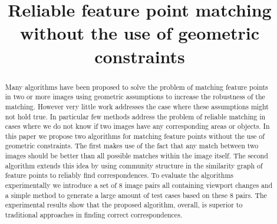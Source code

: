 \documentclass[conference]{IEEEtran}
\begin{document}
\title{Reliable feature point matching without the use of geometric 
constraints}

\maketitle
%
\begin{abstract}
Many algorithms have been proposed to solve the problem of matching 
feature points in two or more images using geometric assumptions to 
increase the robustness of the matching. However very little work 
addresses the case where these assumptions might not hold true. In 
particular few methods address the problem of reliable matching in cases 
where we do not know if two images have any corresponding areas or 
objects. In this paper we propose two algorithms for matching feature 
points without the use of geometric constraints. The first makes use of 
the fact that any match between two images should be better than all 
possible matches within the image itself. The second algorithm extends 
this idea by using community structure in the similarity graph of 
feature points to reliably find correspondences. To evaluate the 
algorithms experimentally we introduce a set of 8 image pairs all 
containing viewport changes and a simple method to generate a large 
amount of test cases based on these 8 pairs. The experimental results 
show that the proposed algorithm, overall, is superior to traditional 
approaches in finding correct correspondences.
\end{abstract}
%
\end{document}

